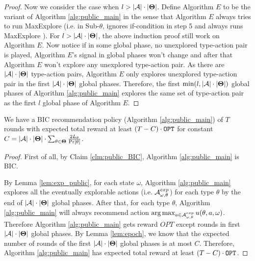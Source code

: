 \begin{proof}
Now we consider the case when $l > |\mathcal{A}| \cdot |\bold{\Theta}|$. Define Algorithm $E$ to be the variant of Algorithm \ref{alg:public_main} in the sense that Algorithm $E$ always tries to run MaxExplore (i.e. in Sub-$\theta$, ignores if-condition in step 5 and always runs MaxExplore ). For $l > |\mathcal{A}| \cdot |\bold{\Theta}|$, the above induction proof still work on Algorithm $E$. Now notice if in some global phase, no unexplored type-action pair is played, Algorithm $E$'s signal in global phases won't change and after that Algorithm $E$ won't explore any unexplored type-action pair. As there are $ |\mathcal{A}| \cdot |\bold{\Theta}|$ type-action pairs, Algorithm $E$ only explores unexplored type-action pair in the first $ |\mathcal{A}| \cdot |\bold{\Theta}|$ global phases. Therefore, the first $\min(l,|\mathcal{A}|\cdot |\bold{\Theta}|)$ global phases of Algorithm \ref{alg:public_main} explores the same set of type-action pair as the first $l$ global phase of Algorithm $E$.
\end{proof}

\begin{corollary}
\label{cor:public}
We have a BIC recommendation policy (Algorithm \ref{alg:public_main}) of $T$ rounds with expected total reward at least $\left(T - C \right) \cdot \mathtt{OPT}$ for constant $C = |\mathcal{A}| \cdot |\bold{\Theta}| \cdot \sum_{\theta\in\bold{\Theta}} \frac{2L_{\theta}}{\Pr[\theta]}$.
\end{corollary}

\begin{proof}
First of all, by Claim \ref{clm:public_BIC}, Algorithm \ref{alg:public_main} is BIC.

By Lemma \ref{lem:exp_public}, for each state $\omega$, Algorithm \ref{alg:public_main} explores all the eventually explorable actions (i.e. $\mathcal{A}_{\omega,\theta}^{exp}$) for each type $\theta$ by the end of $|\mathcal{A}|\cdot |\bold{\Theta}|$ global phases. After that, for each type $\theta$, Algorithm \ref{alg:public_main} will always recommend action $ \arg\max_{a \in \mathcal{A}_{\omega,\theta}^{exp}} u(\theta, a, \omega)$. Therefore Algorithm \ref{alg:public_main} gets reward $OPT$ except rounds in first $|\mathcal{A}|\cdot |\bold{\Theta}|$ global phases. By Lemma \ref{lem:epoch}, we know that the expected number of rounds of the first  $|\mathcal{A}|\cdot |\bold{\Theta}|$ global phases is at most $C$. Therefore, Algorithm \ref{alg:public_main} has expected total reward at least  $\left(T - C \right) \cdot \mathtt{OPT}$.

\end{proof} 